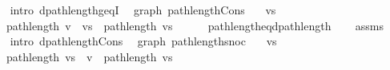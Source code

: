 \begin{isabellebody}
\ \ \isamarkupfalse%
\ {\isacharparenleft}{\kern0pt}intro\ dpath{\isacharunderscore}{\kern0pt}length{\isacharunderscore}{\kern0pt}geq{\isacharunderscore}{\kern0pt}{}I{\isacharparenright}{\kern0pt}%
\endisatagproof
{\isafoldproof}%
%
\isadelimproof
\isanewline
%
\endisadelimproof
%
\isadeliminvisible
\isanewline
%
\endisadeliminvisible
%
\isataginvisible
{}\isamarkupfalse%
\ {\isacharparenleft}{\kern0pt}\ graph{\isacharparenright}{\kern0pt}\ path{\isacharunderscore}{\kern0pt}length{\isacharunderscore}{\kern0pt}Cons{\isacharcolon}{\kern0pt}\isanewline
\ \ \ {\isachardoublequoteopen}vs\ {\isasymnoteq}\ {\isacharbrackleft}{\kern0pt}{\isacharbrackright}{\kern0pt}{\isachardoublequoteclose}\isanewline
\ \ \ {\isachardoublequoteopen}path{\isacharunderscore}{\kern0pt}length\ {\isacharparenleft}{\kern0pt}v\ {\isacharhash}{\kern0pt}\ vs{\isacharparenright}{\kern0pt}\ {\isacharequal}{\kern0pt}\ path{\isacharunderscore}{\kern0pt}length\ vs\ {\isacharplus}{\kern0pt}\ {}{\isachardoublequoteclose}%
\endisataginvisible
{\isafoldinvisible}%
%
\isadeliminvisible
\isanewline
%
\endisadeliminvisible
%
\isadelimproof
\ \ %
\endisadelimproof
%
\isatagproof
{}\isamarkupfalse%
\ path{\isacharunderscore}{\kern0pt}length{\isacharunderscore}{\kern0pt}eq{\isacharunderscore}{\kern0pt}dpath{\isacharunderscore}{\kern0pt}length\isanewline
\ \ \isamarkupfalse%
\ assms\isanewline
\ \ \isamarkupfalse%
\ {\isacharparenleft}{\kern0pt}intro\ dpath{\isacharunderscore}{\kern0pt}length{\isacharunderscore}{\kern0pt}Cons{\isacharparenright}{\kern0pt}%
\endisatagproof
{\isafoldproof}%
%
\isadelimproof
\isanewline
%
\endisadelimproof
%
\isadeliminvisible
\isanewline
%
\endisadeliminvisible
%
\isataginvisible
{}\isamarkupfalse%
\ {\isacharparenleft}{\kern0pt}\ graph{\isacharparenright}{\kern0pt}\ path{\isacharunderscore}{\kern0pt}length{\isacharunderscore}{\kern0pt}snoc{\isacharcolon}{\kern0pt}\isanewline
\ \ \ {\isachardoublequoteopen}vs\ {\isasymnoteq}\ {\isacharbrackleft}{\kern0pt}{\isacharbrackright}{\kern0pt}{\isachardoublequoteclose}\isanewline
\ \ \ {\isachardoublequoteopen}path{\isacharunderscore}{\kern0pt}length\ {\isacharparenleft}{\kern0pt}vs\ {\isacharat}{\kern0pt}\ {\isacharbrackleft}{\kern0pt}v{\isacharbrackright}{\kern0pt}{\isacharparenright}{\kern0pt}\ {\isacharequal}{\kern0pt}\ path{\isacharunderscore}{\kern0pt}length\ vs\ {\isacharplus}{\kern0pt}\ {}{\isachardoublequoteclose}%

\end{isabellebody}
